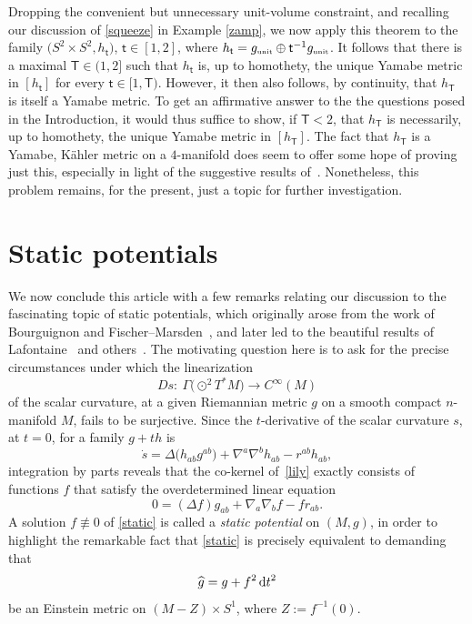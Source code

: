 \documentclass[10pt,a4paper]{amsart}
\numberwithin{equation}{section}
\begin{document}
Dropping the convenient but unnecessary unit-volume constraint, and recalling our discussion of \eqref{squeeze} in Example \ref{zamp}, we now apply this theorem to
the family $\big(S^2 \times S^2, h_{\mathsf{t}}\big)$, $\mathsf{t}\in [1,2]$, where $h_{\mathsf{t}}
=g_{\text{\tiny unit}}\oplus \mathsf{t}^{-1} g_{\text{\tiny unit}}$.
It follows that there is a maximal $\mathsf{T} \in (1,2]$
such that
$h_{\mathsf{t}}$ is, up to homothety,
the {unique} Yamabe metric in $[h_{\mathsf{t}}]$ for every $\mathsf{t}\in [1,\mathsf{T})$. However, it then also follows, by continuity, that
$h_{\mathsf{T}}$ is itself a Yamabe metric. To get an affirmative answer to the
the questions posed in the Introduction, it would thus suffice to show, if $\mathsf{T} < 2$, that $h_{\mathsf{T}}$ is necessarily, up to homothety,
the {\sf unique} Yamabe metric in $[h_{\mathsf{T}}]$. The fact that $h_{\mathsf{T}}$ is a Yamabe, K\"ahler metric on a $4$-manifold does seem to offer some hope of proving just this,
especially in light of the suggestive results of~\cite{gursky, gl1}. Nonetheless, this problem remains, for the present, just a topic for further investigation.

\section{Static potentials}

We now conclude this article with a few remarks relating our discussion to the fascinating topic of static potentials, which originally arose
from the work of Bourguignon \cite{bourguignon} and Fischer--Marsden~\cite{fischer-marsden}, and later led to the beautiful results
of Lafontaine~\cite{lafontaine} and others~\cite{ambrozio,corvino,seshadri}.
The motivating question here is to ask for the precise circumstances under which the linearization
\begin{equation}\label{lily}
Ds\colon \ \Gamma \big({\odot}^2 T^*M\big)\to C^{\infty}(M)
\end{equation}
 of the scalar curvature, at a given Riemannian metric $g$ on a smooth compact $n$-manifold $M$,
 fails to be surjective. Since the $t$-derivative of the scalar curvature $s$, at $t=0$, for a family
 $g+ t h$ is
 \begin{equation*}
\dot{s}=\Delta \big(h_{ab}g^{ab}\big) + \nabla^a\nabla^bh_{ab} - r^{ab}h_{ab},
\end{equation*}
integration by parts reveals that
the co-kernel of~\eqref{lily} exactly consists of functions $f$ that satisfy the overdetermined linear equation
 \begin{equation}\label{static}
0= (\Delta f)g_{ab} + \nabla_a \nabla_b f - fr_{ab}.
\end{equation}
A solution $f\not\equiv 0$ of \eqref{static} is called a {\em static potential}
on $(M,g)$, in order to highlight the remarkable fact \cite[Corollary~9.107, with $p=1$, $\hat{\lambda}=0$]{bes} that
\eqref{static} is precisely equivalent to demanding that
\begin{equation}\label{warp}
\widehat{g}=g+f^2 \,{\rm d}t^2
\end{equation}
 be an Einstein metric on $(M-Z) \times S^1$, where $Z:=f^{-1}(0)$.
\end{document}
